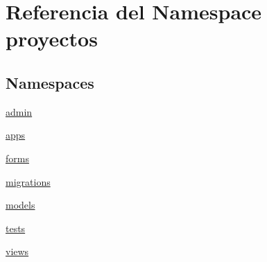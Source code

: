 \hypertarget{namespaceproyectos}{}\section{Referencia del Namespace proyectos}
\label{namespaceproyectos}
\subsection*{Namespaces}
\begin{DoxyCompactItemize}
\item 
 \hyperlink{namespaceproyectos_1_1admin}{admin}
\item 
 \hyperlink{namespaceproyectos_1_1apps}{apps}
\item 
 \hyperlink{namespaceproyectos_1_1forms}{forms}
\item 
 \hyperlink{namespaceproyectos_1_1migrations}{migrations}
\item 
 \hyperlink{namespaceproyectos_1_1models}{models}
\item 
 \hyperlink{namespaceproyectos_1_1tests}{tests}
\item 
 \hyperlink{namespaceproyectos_1_1views}{views}
\end{DoxyCompactItemize}
